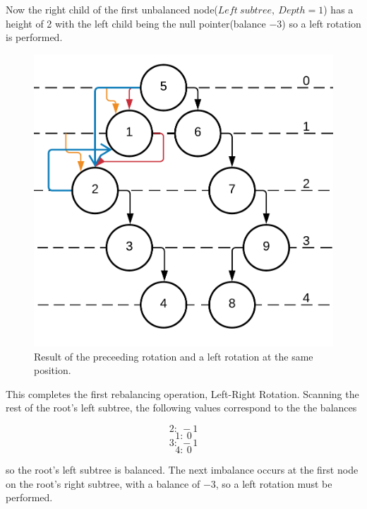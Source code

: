 \documentclass[journal]{IEEEtran}
\begin{document}
Now the right child of the first unbalanced node($Left~subtree,~Depth = 1$) has a height of 2 with the left 
child being the null pointer(balance $-3$) so a left rotation is performed.

\begin{figure}[h!]
	\includegraphics[scale = 0.2]{avl12.png}
	\caption{Result of the preceeding rotation and a left rotation at the same position.}
\end{figure}

This completes the first rebalancing operation, Left-Right Rotation. Scanning the rest 
of the root's left subtree, the following values correspond to the the balances

$$2:~-1$$
$$1:~0$$
$$3:~-1$$
$$4:~0$$

so the root's left subtree is balanced. The next imbalance occurs at the first node 
on the root's right subtree, with a balance of $-3$, so a left rotation must be performed.
\end{document}

